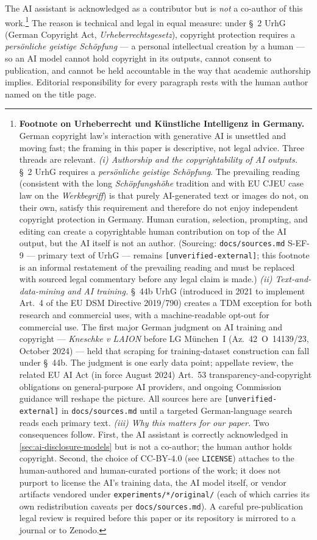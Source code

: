 \documentclass[11pt,a4paper]{article}
\begin{document}
The AI assistant is acknowledged as a contributor but is \emph{not} a
co-author of this work.\footnote{\textbf{Footnote on Urheberrecht und
K\"unstliche Intelligenz in Germany.} German copyright law's interaction
with generative AI is unsettled and moving fast; the framing in this
paper is descriptive, not legal advice. Three threads are relevant.
\emph{(i) Authorship and the copyrightability of AI outputs.}
\S{}~2 UrhG requires a \emph{pers\"onliche geistige Sch\"opfung}. The
prevailing reading (consistent with the long \emph{Sch\"opfungsh\"ohe}
tradition and with EU CJEU case law on the \emph{Werkbegriff}) is that
purely AI-generated text or images do not, on their own, satisfy this
requirement and therefore do not enjoy independent copyright protection
in Germany. Human curation, selection, prompting, and editing can create
a copyrightable human contribution on top of the AI output, but the AI
itself is not an author. (Sourcing: \texttt{docs/sources.md} S-EF-9 ---
primary text of UrhG --- remains \texttt{[unverified-external]}; this
footnote is an informal restatement of the prevailing reading and must
be replaced with sourced legal commentary before any legal claim is
made.) \emph{(ii) Text-and-data-mining and AI training.}
\S{}~44b UrhG (introduced in 2021 to implement Art.~4 of the EU DSM
Directive 2019/790) creates a TDM exception for both research and
commercial uses, with a machine-readable opt-out for commercial use.
The first major German judgment on AI training and copyright ---
\emph{Kneschke v LAION} before LG M\"unchen~I (Az.\ 42~O~14139/23,
October 2024) --- held that scraping for training-dataset construction
can fall under \S{}~44b. The judgment is one early data point;
appellate review, the related EU AI Act (in force August 2024)
Art.~53 transparency-and-copyright obligations on general-purpose AI
providers, and ongoing Commission guidance will reshape the picture.
All sources here are \texttt{[unverified-external]} in
\texttt{docs/sources.md} until a targeted German-language search reads
each primary text. \emph{(iii) Why this matters for our paper.} Two
consequences follow. First, the AI assistant is correctly acknowledged
in \cref{sec:ai-disclosure-models} but is not a co-author; the human
author holds copyright. Second, the choice of CC-BY-4.0 (see
\texttt{LICENSE}) attaches to the human-authored and human-curated
portions of the work; it does not purport to license the AI's training
data, the AI model itself, or vendor artifacts vendored under
\texttt{experiments/*/original/} (each of which carries its own
redistribution caveats per \texttt{docs/sources.md}). A careful
pre-publication legal review is required before this paper or its
repository is mirrored to a journal or to Zenodo.}
The reason is technical and legal in equal measure: under \S{}~2 UrhG
(German Copyright Act, \emph{Urheberrechtsgesetz}), copyright
protection requires a \emph{pers\"onliche geistige Sch\"opfung} --- a
personal intellectual creation by a human --- so an AI model cannot
hold copyright in its outputs, cannot consent to publication, and
cannot be held accountable in the way that academic authorship
implies. Editorial responsibility for every paragraph rests with the
human author named on the title page.
\end{document}
